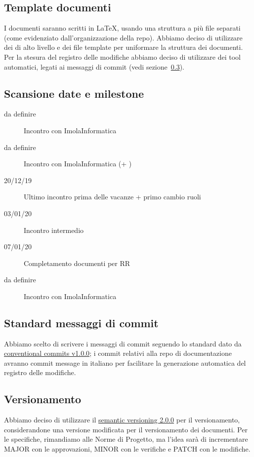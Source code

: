 \documentclass{article}
\begin{document}
\subsection{Template documenti}
\label{sub:template_documenti}

I documenti saranno scritti in LaTeX, usando una struttura a più file separati (come evidenziato dall'organizzazione della repo).
Abbiamo deciso di utilizzare dei  di alto livello e dei file template per uniformare la struttura dei documenti.
Per la stesura del registro delle modifiche abbiamo deciso di utilizzare dei tool automatici, legati ai messaggi di commit (vedi sezione~\ref{sub:standard_messaggi_di_commit}).

\subsection{Scansione date e milestone}
\label{sub:scansione_date_e_milestone}

\begin{description}
  \item[da definire] Incontro con ImolaInformatica
  \item[da definire] Incontro con ImolaInformatica (+ \varepsilon)
  \item[20/12/19] Ultimo incontro prima delle vacanze + primo cambio ruoli
  \item[03/01/20] Incontro intermedio
  \item[07/01/20] Completamento documenti per RR
  \item[da definire] Incontro con ImolaInformatica
\end{description}

\subsection{Standard messaggi di commit}
\label{sub:standard_messaggi_di_commit}

Abbiamo scelto di scrivere i messaggi di commit seguendo lo standard dato da \href{https://www.conventionalcommits.org/en/v1.0.0/}{conventional commits v1.0.0};
i commit relativi alla repo di documentazione avranno commit message in italiano per facilitare la generazione automatica del registro delle modifiche.

\subsection{Versionamento}
\label{sub:versionamento}
Abbiamo deciso di utilizzare il \href{https://semver.org/}{semantic versioning 2.0.0} per il versionamento, considerandone una versione modificata per il versionamento dei documenti.
Per le specifiche, rimandiamo alle Norme di Progetto, ma l'idea sarà di incrementare MAJOR con le approvazioni, MINOR con le verifiche e PATCH con le modifiche.
\end{document}
